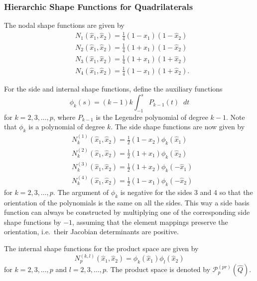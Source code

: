 \documentclass[english, 12pt, a4paper, sci, utf8, a-2b, online]{aaltothesis}
\theoremstyle{definition}
\theoremstyle{plain}
\newcommand*\diff{\mathop{}\!d}
\numberwithin{equation}{section}
\begin{document}
\subsubsection{Hierarchic Shape Functions for Quadrilaterals}
\label{subsubsec:quad_shape_functions}

The nodal shape functions are given by
\begin{align*}
    &N_1(\hat{x}_1,\hat{x}_2) = \frac{1}{4}(1 - \hat{x}_1)(1 - \hat{x}_2) \\[0.5em]
    &N_2(\hat{x}_1,\hat{x}_2) = \frac{1}{4}(1 + \hat{x}_1)(1 - \hat{x}_2) \\[0.5em]
    &N_3(\hat{x}_1,\hat{x}_2) = \frac{1}{4}(1 + \hat{x}_1)(1 + \hat{x}_2) \\[0.5em]
    &N_4(\hat{x}_1,\hat{x}_2) = \frac{1}{4}(1 - \hat{x}_1)(1 + \hat{x}_2).
\end{align*}

For the side and internal shape functions, define the auxiliary functions
\begin{equation}
    \label{eq:phi_shape}
    \phi_k(s) = (k-1) k \int_{-1}^{s} P_{k-1}(t) \diff t
\end{equation}
for $k=2,3,\dotsc,p$, where $P_{k-1}$ is the Legendre polynomial of degree $k-1$.
Note that $\phi_k$ is a polynomial of degree $k$.
The side shape functions are now given by
\begin{align*}
    &N_k^{(1)}(\hat{x}_1,\hat{x}_2) = \frac{1}{2} (1 - \hat{x}_2) \phi_k(\hat{x}_1) \\[0.5em]
    &N_k^{(2)}(\hat{x}_1,\hat{x}_2) = \frac{1}{2} (1 + \hat{x}_1) \phi_k(\hat{x}_2) \\[0.5em]
    &N_k^{(3)}(\hat{x}_1,\hat{x}_2) = \frac{1}{2} (1 + \hat{x}_2) \phi_k(-\hat{x}_1) \\[0.5em]
    &N_k^{(4)}(\hat{x}_1,\hat{x}_2) = \frac{1}{2} (1 - \hat{x}_1) \phi_k(-\hat{x}_2)
\end{align*}
for $k=2,3,\dotsc,p$. The argument of $\phi_k$ is negative for the sides 3 and 4
so that the orientation of the polynomials is the same on all the sides.
This way a side basis function can always be constructed by multiplying
one of the corresponding side shape functions by $-1$,
assuming that the element mappings preserve the orientation,
i.e.\ their Jacobian determinants are positive.

The internal shape functions for the product space are given by
\begin{equation}
    \label{eq:quad_internal_shape_function}
    N_p^{(k,l)}(\hat{x}_1,\hat{x}_2) = \phi_k(\hat{x}_1) \phi_l(\hat{x}_2)
\end{equation}
for $k=2,3,\dotsc,p$ and $l=2,3,\dotsc,p$.
The product space is denoted by $\mathcal{P}_p^{(pr)}(\widehat{Q})$.
\end{document}
